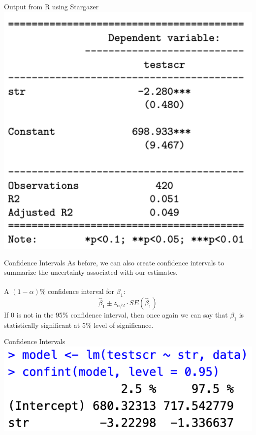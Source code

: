 \documentclass{./../div_teaching_slides}
\begin{document}
\begin{frame}{Output from R using Stargazer}
\vspace{-0.5em}
\centering
\includegraphics[scale=0.375]{reg_output_stargazer.png}
\end{frame}

\begin{frame}{Confidence Intervals}
As before, we can also create confidence intervals to summarize the uncertainty associated with our estimates. \\~\\
A $(1-\alpha)\%$ confidence interval for $\beta_1$:
$$ \hat{\beta}_1 \pm  z_{\alpha/2} \cdot SE(\hat{\beta}_1)  $$
If $0$ is not in the 95\% confidence interval, then once again we can say that $\beta_1$ is statistically significant at 5\% level of significance. 
\end{frame}

\begin{frame}{Confidence Intervals}
\vfill
\centering
\includegraphics[scale=0.45]{ci_output.png}
\end{frame}
\end{document}
